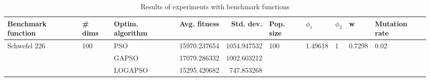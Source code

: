 \begin{table}
\centering
\caption{Results of experiments with benchmark functions}
\begin{tabular}{lllrrlllll}
\toprule
           Benchmark function &              \# dims & Optim. algorithm &  Avg. fitness &   Std. dev. &            Pop. size &               $\phi_{1}$ &         $\phi_{2}$ &                       w &         Mutation rate \\
\midrule
\multirow{3}{*}{Schwefel 226} & \multirow{3}{*}{100} &              PSO &  15970.237654 & 1054.947532 & \multirow{3}{*}{100} & \multirow{3}{*}{1.49618} & \multirow{3}{*}{1} & \multirow{3}{*}{0.7298} & \multirow{3}{*}{0.02} \\
                              &                      &            GAPSO &  17079.286332 & 1002.603212 &                      &                          &                    &                         &                       \\
                              &                      &          LOGAPSO &  15295.420682 &  747.853268 &                      &                          &                    &                         &                       \\
\bottomrule
\end{tabular}
\end{table}
